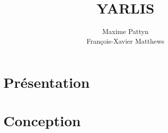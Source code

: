 \documentclass{report}
\title{YARLIS}
\author{Maxime Pattyn\\François-Xavier Matthews}
\date{}
\begin{document}
\maketitle{}

\chapter{Présentation}



\chapter{Conception}
\end{document}
